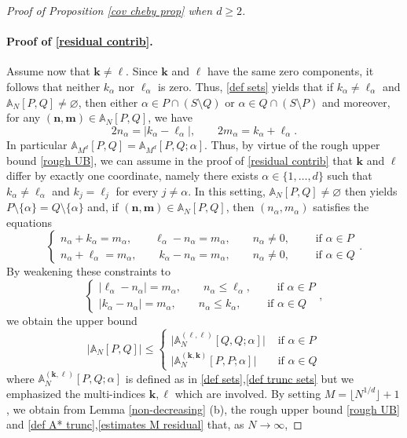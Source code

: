 \documentclass[a4paper,11pt]{article}
\numberwithin{equation}{section}
\theoremstyle{definition}
\newcommand{\rev}[1]{#1}
\newcommand{\eq}{\begin{equation}}
\newcommand{\qe}{\end{equation}}
\newcommand{\bs}{\boldsymbol}
\renewcommand{\leq}{\leqslant}
\renewcommand{\geq}{\geqslant}
\renewcommand{\emptyset}{\varnothing}
\begin{document}
\begin{proof}[Proof of Proposition \ref{cov cheby prop} when $d\geq 2$]
\rev{\paragraph*{Proof of  \eqref{residual contrib}.}}
 Assume now that $\bs
k\neq\bs \ell$. Since $\bs k$ and $\bs \ell$ have the same zero
components, it follows that neither $k_\alpha$ nor $\ell_\alpha$ is
zero. Thus, \eqref{def sets} yields that if  $k_\alpha\neq
\ell_\alpha$ and  $\mathbb A_{N}[P,Q]\neq \emptyset$, then either
$\alpha\in P\cap (S\setminus Q)$ or $\alpha\in Q\cap (S \setminus P)$ and moreover, for any $(\bs n ,\bs m)\in \mathbb A_{N}[P,Q]$, we have
\[
2n_\alpha=|k_\alpha-\ell_\alpha|,\qquad 2m_\alpha=k_\alpha+\ell_\alpha.
\]
In particular $\mathbb A_{M^d}[P,Q]=\mathbb A_{M^d}[P,Q;\alpha]$. Thus,  by virtue of the rough upper bound \eqref{rough UB}, we can assume in the proof of \eqref{residual contrib} that $\bs k$ and $\bs \ell$ differ by exactly one coordinate, namely there exists $\alpha\in\{1,\ldots,d\}$ such that $k_\alpha\neq \ell_\alpha$ and  $k_j=\ell_j$ for every $j\neq \alpha$.
In this setting, $\mathbb A_{N}[P,Q]\neq \emptyset$ then yields $P\setminus\{\alpha\}=Q\setminus\{\alpha\}$ and, if $(\bs n,\bs m)\in\mathbb A_N[P,Q]$, then  $(n_\alpha,m_\alpha)$ satisfies the equations
\[
\begin{cases}
n_\alpha+k_\alpha=m_\alpha,\qquad \ell_\alpha-n_\alpha=m_\alpha,\qquad n_\alpha\neq 0,\qquad \mbox{ if } \alpha\in P\\
n_\alpha+\ell_\alpha=m_\alpha,\qquad k_\alpha-n_\alpha=m_\alpha,\qquad n_\alpha\neq 0,\qquad \mbox{ if } \alpha\in Q
\end{cases} .
\]
By weakening these constraints to
\[
\begin{cases}
| \ell_\alpha-n_\alpha|=m_\alpha,\qquad n_\alpha\leq \ell_\alpha,\qquad  \mbox{ if } \alpha\in P\\
 |k_\alpha-n_\alpha|=m_\alpha,\qquad n_\alpha\leq k_\alpha,\qquad  \mbox{ if } \alpha\in Q
\end{cases},
\]
we obtain the upper bound
\eq
\label{residual A}
\big | \mathbb A_{N}[P,Q] \big | \leq
\begin{cases}
\big | \mathbb A_{N}^{(\bs \ell,\bs \ell)}[Q,Q;\alpha] \big |& \mbox{ if } \alpha\in P\\
\big | \mathbb A_{N}^{(\bs k,\bs k)}[P,P;\alpha] \big |& \mbox{ if } \alpha\in Q
\end{cases}
\qe
where $\mathbb A_{N}^{(\bs k,\bs \ell)}[P,Q;\alpha]$ is defined as in \eqref{def sets},\eqref{def trunc sets} but we emphasized the multi-indices $\bs k,\bs \ell$ which are involved.  By setting  $M=\lfloor N^{1/d}\rfloor+1$,  we obtain from Lemma \ref{non-decreasing} (b), the rough upper bound \eqref{rough UB} and  \eqref{def A* trunc},\eqref{estimates M residual} that,  as $N\to\infty$,

\end{proof}
\end{document}
